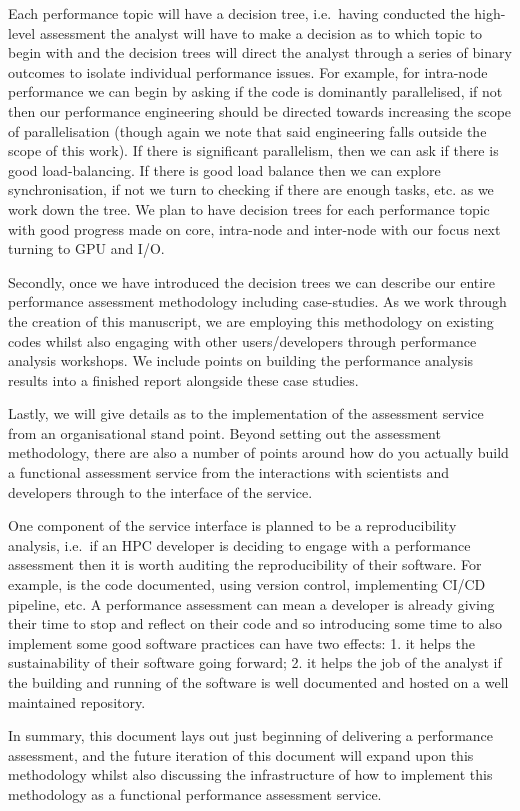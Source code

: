 Each performance topic will have a decision tree, i.e.~having conducted the high-level assessment the analyst will have to make a decision as to which topic to begin with and the decision trees will direct the analyst through a series of binary outcomes to isolate individual performance issues. For example, for intra-node performance we can begin by asking if the code is dominantly parallelised, if not then our performance engineering should be directed towards increasing the scope of parallelisation (though again we note that said engineering falls outside the scope of this work). If there is significant parallelism, then we can ask if there is good load-balancing. If there is good load balance then we can explore synchronisation, if not we turn to checking if there are enough tasks, etc. as we work down the tree. We plan to have decision trees for each performance topic with good progress made on core, intra-node and inter-node with our focus next turning to GPU and I/O.


Secondly, once we have introduced the decision trees we can describe our entire performance assessment methodology including case-studies. As we work through the creation of this manuscript, we are employing this methodology on existing codes whilst also engaging with other users/developers through performance analysis workshops. We include points on building the performance analysis results into a finished report alongside these case studies.

Lastly, we will give details as to the implementation of the assessment service from an organisational stand point. Beyond setting out the assessment methodology, there are also a number of points around how do you actually build a functional assessment service from the interactions with scientists and developers through to the interface of the service.

One component of the service interface is planned to be a reproducibility analysis, i.e.~if an HPC developer is deciding to engage with a performance assessment then it is worth auditing the reproducibility of their software. For example, is the code documented, using version control, implementing CI/CD pipeline, etc. A performance assessment can mean a developer is already giving their time to stop and reflect on their code and so introducing some time to also implement some good software practices can have two effects: 1. it helps the sustainability of their software going forward; 2. it helps the job of the analyst if the building and running of the software is well documented and hosted on a well maintained repository.

In summary, this document lays out just beginning of delivering a performance assessment, and the future iteration of this document will expand upon this methodology whilst also discussing the infrastructure of how to implement this methodology as a functional performance assessment service. 